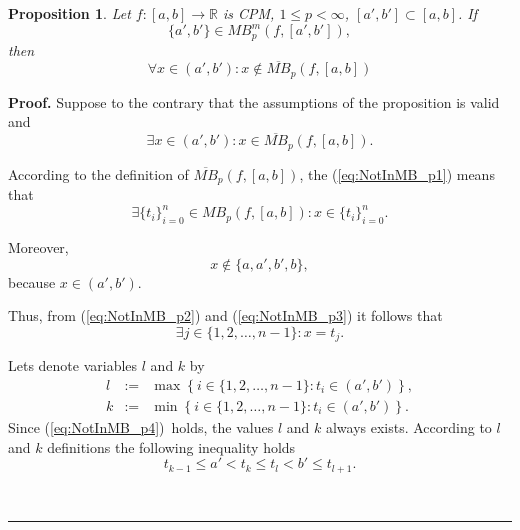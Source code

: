 \documentclass[12pt, a4paper]{article}
\newtheorem{proposition}[theorem]{Proposition}
\newenvironment{proof}[1][Proof]{\noindent \textbf{#1.} }{\  \rule{0.5em}{0.5em}}
\numberwithin{equation}{section}
\begin{document}
\begin{proposition}\label{prop:NotInMB}
  Let $f:[a,b] \rightarrow \mathbb{R}$ is CPM,
  $1 \leq p < \infty$, $[a',b'] \subset [a,b] $. If 
  \begin{equation}\label{eq:NotInMB1}
    \{a',b'\} \in MB_p^m(f,[a',b']),
  \end{equation}
  then
  \begin{equation}\label{eq:NotInMB2}
    \forall x \in (a',b'): x \notin \overline{MB}_p(f,[a,b])    
  \end{equation}
\end{proposition}
\begin{proof}
  Suppose to the contrary that the assumptions of the proposition is valid and    
  \begin{equation}\label{eq:NotInMB_p1}
    \exists x \in (a',b'): x \in \overline{MB}_p(f,[a,b]).
  \end{equation}
  
  According to the definition of $\overline{MB}_p(f,[a,b])$, 
  the (\ref{eq:NotInMB_p1}) means that
  \begin{equation}\label{eq:NotInMB_p3}
    \exists \{t_i\}_{i=0}^n \in MB_{p}(f,[a,b]): x \in \{t_i\}_{i=0}^n.
  \end{equation}  
  
  Moreover, 
  \begin{equation}\label{eq:NotInMB_p2} 
    x \notin \{a, a', b', b\},
  \end{equation} 
  because $x \in (a',b')$.  
  
  Thus, from (\ref{eq:NotInMB_p2}) and (\ref{eq:NotInMB_p3}) it follows that  
  \begin{equation}\label{eq:NotInMB_p4}
    \exists j \in \{1,2,\dots,n-1\} : x = t_j.
  \end{equation}  

  Lets denote variables $l$ and $k$ by
  \begin{eqnarray}
    l &:=& \max \left\{i \in \{1,2,\dots,n-1\} : t_i  \in (a',b') \right\}, \\
    k &:= &\min \left\{i \in \{1,2,\dots,n-1\} : t_i  \in (a',b') \right\}.
  \end{eqnarray}  
  Since (\ref{eq:NotInMB_p4})~holds, the values $l$ and $k$ always exists. 
  According to $l$ and $k$ definitions the following inequality holds  
  \begin{equation}\label{eq:NotInMB_p5}
    t_{k-1} \leq a' < t_{k} \leq t_{l} < b' \leq t_{l+1}.
  \end{equation}
  

\end{proof}
\end{document}

